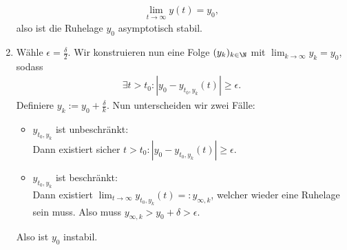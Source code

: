 \begin{solution}
\begin{enumerate}[label = \textbf{\alph*)}]
\begin{align*}
  \lim_{t \to \infty} y(t) = y_0,
\end{align*}
also ist die Ruhelage $y_0$ asymptotisch stabil.
\item Wähle $\epsilon = \frac{\delta}{2}$. Wir konstruieren nun eine Folge
$(y_k)_{k \in \N}$ mit $\lim_{k \rightarrow \infty} y_k = y_0$, sodass
\begin{align*}
  \exists t > t_0: |y_0 - y_{t_0,y_k}(t) | \geq \epsilon.
\end{align*}
Definiere $y_k := y_0 + \frac{\delta}{k}$.
Nun unterscheiden wir zwei Fälle:
\begin{itemize}
  \item $y_{t_0,y_k}$ ist unbeschränkt: \\
  Dann existiert sicher $t > t_0: |y_0 - y_{t_0,y_k}(t) | \geq \epsilon.$
  \item $y_{t_0,y_k}$ ist beschränkt: \\
  Dann existiert $\lim_{t \rightarrow \infty} y_{t_0,y_k}(t) =: y_{\infty,k}$, welcher wieder
  eine Ruhelage sein muss. Also muss $y_{\infty,k} > y_0 + \delta > \epsilon$.
\end{itemize}
Also ist $y_0$ instabil.
\end{enumerate}
\end{solution}
